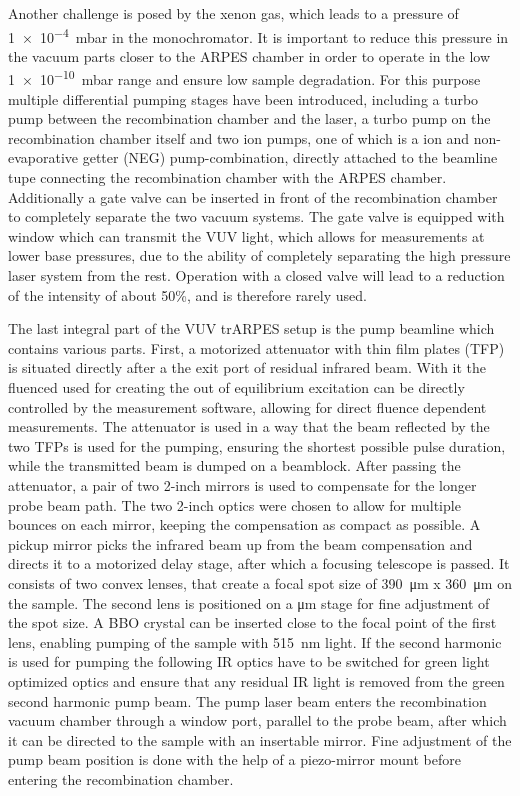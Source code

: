 Another challenge is posed by the xenon gas, which leads to a pressure of \qty{1e-4}{\milli\bar} in the monochromator.
It is important to reduce this pressure in the vacuum parts closer to the ARPES chamber in order to operate in the low \qty{1e-10}{\milli\bar} range and ensure low sample degradation.
For this purpose multiple differential pumping stages have been introduced, including a turbo pump between the recombination chamber and the laser, a turbo pump on the recombination chamber itself and two ion pumps, one of which is a ion and non-evaporative getter (NEG) pump-combination, directly attached to the beamline tupe connecting the recombination chamber with the ARPES chamber.
Additionally a gate valve can be inserted in front of the recombination chamber to completely separate the two vacuum systems.
The gate valve is equipped with  window which can transmit the VUV light, which allows for measurements at lower base pressures, due to the ability of completely separating the high pressure laser system from the rest.
Operation with a closed valve will lead to a reduction of the intensity of about 50\%, and is therefore rarely used.

The last integral part of the VUV trARPES setup is the pump beamline which contains various parts.
First, a motorized attenuator with thin film plates (TFP) is situated directly after a the exit port of residual infrared beam.
With it the fluenced used for creating the out of equilibrium excitation can be directly controlled by the measurement software, allowing for direct fluence dependent measurements.
The attenuator is used in a way that the beam reflected by the two TFPs is used for the pumping, ensuring the shortest possible pulse duration, while the transmitted beam is dumped on a beamblock.
After passing the attenuator, a pair of two 2-inch mirrors is used to compensate for the longer probe beam path.
The two 2-inch optics were chosen to allow for multiple bounces on each mirror, keeping the compensation as compact as possible.
A pickup mirror picks the infrared beam up from the beam compensation and directs it to a motorized delay stage, after which a focusing telescope is passed.
It consists of two convex lenses, that create a focal spot size of \qty{390}{\micro\meter} x \qty{360}{\micro\meter} on the sample.
The second lens is positioned on a \unit{\micro\meter} stage for fine adjustment of the spot size.
A BBO crystal can be inserted  close to the focal point of the first lens, enabling pumping of the sample with \qty{515}{\nano\meter} light.
If the second harmonic is used for pumping the following IR optics have to be switched for green light optimized optics and ensure that any residual IR light is removed from the green second harmonic pump beam.
The pump laser beam enters the recombination vacuum chamber through a window port, parallel to the probe beam, after which it can be directed to the sample with an insertable mirror.
Fine adjustment of the pump beam position is done with the help of a piezo-mirror mount before entering the recombination chamber.

